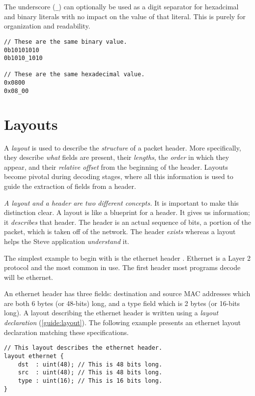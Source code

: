 The underscore (\texttt{\_}) can optionally be used as a digit separator for hexadcimal and binary literals with no impact on the value of that literal.
This is purely for organization and readability.

\begin{codepage}
\begin{lstlisting}
// These are the same binary value.
0b10101010
0b1010_1010

// These are the same hexadecimal value.
0x0800
0x08_00
\end{lstlisting}
\end{codepage}

\section{Layouts} \label{tut:layout}

A \textit{layout} is used to describe the \textit{structure} of a packet header.
More specifically, they describe \textit{what} fields are present, their
\textit{lengths}, the \textit{order} in which they appear, and their
\textit{relative offset} from the beginning of the header. Layouts become
pivotal during decoding stages, where all this information is used to guide the
extraction of fields from a header.

\textit{A layout and a header are two different concepts.}
It is important to make this distinction clear. A layout is like a blueprint for
a header. It gives us information; it \textit{describes} that header. The header
is an actual sequence of bits, a portion of the packet, which is taken off of the
network. The header \textit{exists} whereas a layout helps the Steve application
\textit{understand} it.

The simplest example to begin with is the
ethernet header \cite{eth_std}. Ethernet is a Layer 2 protocol
and the most common in use. The first header most programs decode will be
ethernet.

An ethernet header has three fields: destination and source MAC addresses which
are both 6 bytes (or 48-bits) long, and a type field which is 2 bytes (or
16-bits long). A layout describing the ethernet header is written using a
\textit{layout declaration} (\ref{guide:layout}). The following example presents
an ethernet layout declaration matching these specifications.

\begin{codepage}
\begin{lstlisting}
// This layout describes the ethernet header.
layout ethernet {
	dst  : uint(48); // This is 48 bits long.
	src  : uint(48); // This is 48 bits long.
	type : uint(16); // This is 16 bits long.
}
\end{lstlisting}
\end{codepage}

